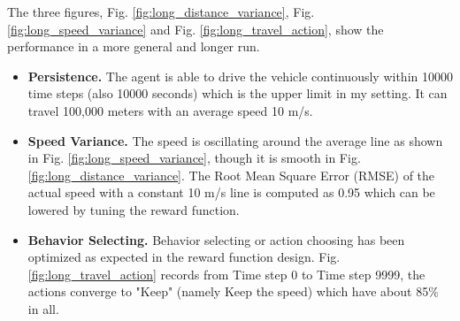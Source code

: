 The three figures, Fig. \ref{fig:long_distance_variance}, Fig. \ref{fig:long_speed_variance} and Fig. \ref{fig:long_travel_action}, show the performance in a more general and longer run. 

\begin{itemize}
	\item \textbf{Persistence.} The agent is able to drive the vehicle continuously within 10000 time steps (also 10000 seconds) which is the upper limit in my setting. It can travel 100,000 meters with an average speed 10 m/s.
	\item \textbf{Speed Variance.} The speed is oscillating around the average line as shown in Fig. \ref{fig:long_speed_variance}, though it is smooth in Fig. \ref{fig:long_distance_variance}. The Root Mean Square Error (RMSE) of the actual speed with a constant 10 m/s line is computed as 0.95 which can be lowered by tuning the reward function.
	\item \textbf{Behavior Selecting.} Behavior selecting or action choosing has been optimized as expected in the reward function design. Fig. \ref{fig:long_travel_action} records from Time step 0 to Time step 9999, the actions converge to "Keep" (namely Keep the speed) which have about 85\% in all.
\end{itemize}


